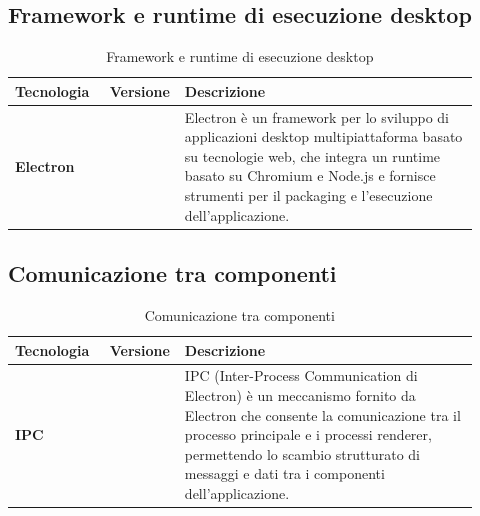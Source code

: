 \documentclass[a4paper,12pt]{article}
\begin{document}
{        \subsection{Framework e runtime di esecuzione desktop}
        \begin{table}[H]
            \captionsetup{skip=10pt}
            \caption{Framework e runtime di esecuzione desktop}
            \begin{tabular}{|>{\centering\arraybackslash}m{0.20\linewidth}|>{\centering\arraybackslash}m{0.10\linewidth}|>{\centering\arraybackslash}m{0.62\linewidth}|}
                \hline
                \textbf{Tecnologia} & \textbf{Versione} & \textbf{Descrizione} \\
                \hline
                \textbf{Electron} &  & Electron è un framework per lo sviluppo di applicazioni desktop multipiattaforma basato su tecnologie web, che integra un runtime basato su Chromium e Node.js e fornisce strumenti per il packaging e l’esecuzione dell’applicazione. \\
                \hline
            \end{tabular}
        \end{table}

        \subsection{Comunicazione tra componenti}
        \begin{table}[H]
            \captionsetup{skip=10pt}
            \caption{Comunicazione tra componenti}
            \begin{tabular}{|>{\centering\arraybackslash}m{0.20\linewidth}|>{\centering\arraybackslash}m{0.10\linewidth}|>{\centering\arraybackslash}m{0.62\linewidth}|}
                \hline
                \textbf{Tecnologia} & \textbf{Versione} & \textbf{Descrizione} \\
                \hline
                \textbf{IPC} &  & IPC (Inter-Process Communication di Electron) è un meccanismo fornito da Electron che consente la comunicazione tra il processo principale e i processi renderer, permettendo lo scambio strutturato di messaggi e dati tra i componenti dell’applicazione. \\
                \hline
            \end{tabular}
        \end{table}

}
\end{document}

